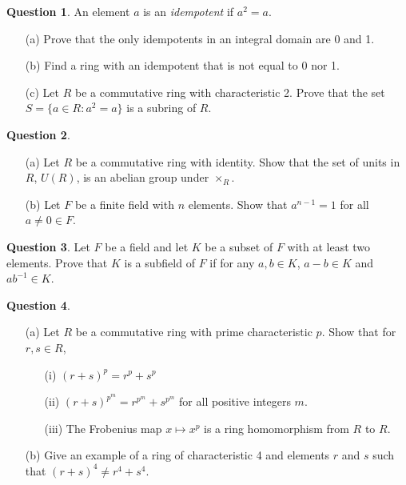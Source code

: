 \documentclass[11pt]{amsart}
\theoremstyle{definition}\newtheorem{definition}{Definition}
\theoremstyle{definition}\newtheorem{question}{Question}
\theoremstyle{definition}\newtheorem*{solution}{Solution}
\theoremstyle{definition}\newtheorem{example}{Example}
\theoremstyle{definition}\newtheorem{notation}{Notation}
\theoremstyle{theorem}\newtheorem{theorem}{Theorem}
\theoremstyle{theorem}\newtheorem{corollary}{Corollary}
\theoremstyle{theorem}\newtheorem{lemma}{Lemma}
\theoremstyle{theorem}\newtheorem{proposition}{Proposition}
\begin{document}
\begin{question}
    An element $a$ is an \emph{idempotent} if $a^2 = a$.
    \begin{itemize}
        \item[(a)] Prove that the only idempotents in an integral domain are 0 and 1.
        \item[(b)] Find a ring with an idempotent that is not equal to 0 nor 1.
        \item[(c)] Let $R$ be a commutative ring with characteristic 2. Prove that the set $S = \{a \in R : a^2 = a\}$ is a subring of $R$.
    \end{itemize}
\end{question}

\begin{question}
    \begin{itemize}
        \item[(a)] Let $R$ be a commutative ring with identity. Show that the set of units in $R$, $U(R)$, is an abelian group under $\times_R$.
        \item[(b)] Let $F$ be a finite field with $n$ elements. Show that $a^{n - 1} = 1$ for all $a \neq 0 \in F$.
    \end{itemize}
\end{question}

\begin{question}
    Let $F$ be a field and let $K$ be a subset of $F$ with at least two elements. Prove that $K$ is a subfield of $F$ if for any $a, b \in K$, $a - b \in K$ and $ab^{-1} \in K$.
\end{question}

\begin{question}
    \begin{itemize}
        \item[(a)] Let $R$ be a commutative ring with prime characteristic $p$. Show that for $r, s \in R$,
        \begin{itemize}
            \item[(i)] $(r + s)^p = r^p + s^p$
            \item[(ii)] $(r + s)^{p^m} = r^{p^m} + s^{p^m}$ for all positive integers $m$.
            \item[(iii)] The Frobenius map $x \mapsto x^p$ is a ring homomorphism from $R$ to $R$.
        \end{itemize}
        \item[(b)] Give an example of a ring of characteristic 4 and elements $r$ and $s$ such that $(r + s)^4 \neq r^4 + s^4$.
    \end{itemize}
\end{question}
\end{document}
